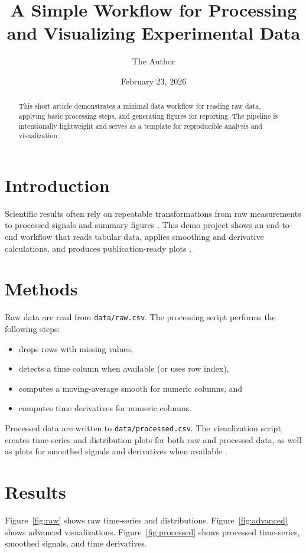 \documentclass[11pt]{article}
\title{A Simple Workflow for Processing and Visualizing Experimental Data}
\author{The Author}
\date{February 23, 2026}
\begin{document}
\maketitle

\begin{abstract}
This short article demonstrates a minimal data workflow for reading raw data,
applying basic processing steps, and generating figures for reporting. The
pipeline is intentionally lightweight and serves as a template for
reproducible analysis and visualization.
\end{abstract}

\section{Introduction}
Scientific results often rely on repeatable transformations from raw
measurements to processed signals and summary figures
\cite{wilkinson2016fair,lowe2019good}. This demo project shows an end-to-end
workflow that reads tabular data, applies smoothing and derivative
calculations, and produces publication-ready plots
\cite{tufte2001visual}.

\section{Methods}
Raw data are read from \texttt{data/raw.csv}. The processing script performs
the following steps:
\begin{itemize}
  \item drops rows with missing values,
  \item detects a time column when available (or uses row index),
  \item computes a moving-average smooth for numeric columns, and
  \item computes time derivatives for numeric columns.
\end{itemize}
Processed data are written to \texttt{data/processed.csv}. The visualization
script creates time-series and distribution plots for both raw and processed
data, as well as plots for smoothed signals and derivatives when available
\cite{mckenna2021dataviz}.

\section{Results}
Figure~\ref{fig:raw} shows raw time-series and distributions.
Figure~\ref{fig:advanced} shows advanced visualizations.
Figure~\ref{fig:processed} shows processed time-series, smoothed signals, and
time derivatives.
\end{document}
